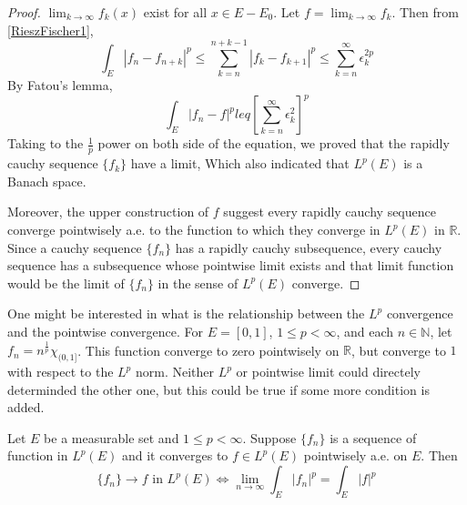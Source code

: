 \documentclass[lang=en, 12pt]{elegantbook}
\newcommand{\RR}{\mathbb{R}}
\newcommand{\NN}{\mathbb{N}}
\begin{document}
\begin{proof}
        $\lim_{k \to \infty} f_k(x)$ exist for all $x \in E-E_0$. Let $f = \lim_{k \to \infty} f_k$.
        Then from \eqref{RieszFischer1},
            $$\int_E |f_n - f_{n+k}|^p \leq 
            \sum_{k=n}^{n+k-1}  |f_k -f_{k+1}|^p
            \leq \sum_{k=n}^{\infty} \epsilon^{2p}_k$$ 
        By Fatou's lemma,
        $$\int_E |f_n-f|^p leq \left[\sum_{k=n}^{\infty} \epsilon^{2}_k\right]^p$$
        Taking to the $\frac{1}{p}$ power on both side of the equation, we proved that the 
        rapidly cauchy sequence $\{f_k\}$ have a limit, Which also indicated that 
        $L^p(E)$ is a Banach space.\par
            Moreover, the upper construction of $f$ suggest every rapidly cauchy sequence 
        converge pointwisely a.e. to the function to which they converge in $L^p(E)$ in $\RR$. 
        Since a cauchy sequence $\{f_n\}$ has a rapidly cauchy subsequence, every cauchy sequence 
        has a subsequence whose pointwise limit exists and that limit function would be 
        the limit of $\{f_n\}$ in the sense of $L^p(E)$ converge.
        \end{proof}
        \begin{remark}
            One might be interested in what is the relationship between the $L^p$
        convergence and the pointwise convergence. For $E=[0,1]$, $1\leq p <\infty$, and each 
        $n \in \NN$, let $f_n= n^{\frac{1}{p}} \chi_{(0,1]}$. This function converge to 
        zero pointwisely on $\RR$, but converge to $1$ with respect to the $L^p$ norm.
        Neither $L^p$ or pointwise limit could directely determinded the other one, but 
        this could be true if some more condition is added.
        \end{remark}
        \begin{theorem}
            Let $E$ be a measurable set and $1 \leq p < \infty$. Suppose $\{f_n\} $ is a
        sequence of function in $L^p(E)$ and it converges to $f\in L^p(E)$ pointwisely a.e.
        on $E$. Then 
        $$\{f_n\} \to f \mbox{ in } L^p(E) \Leftrightarrow 
        \lim_{n \to \infty} \int_E |f_n|^p  = \int_E |f|^p $$
        \end{theorem}
\end{document}
